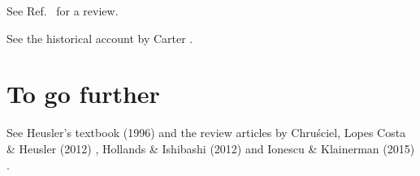 See Ref.~\cite{IonesK15} for a review.

\begin{hist}
See the historical account by Carter \cite{Carte99}.
\end{hist}


\section{To go further}

See Heusler's textbook (1996) \cite{Heusl96} and the review
articles by Chru\'sciel, Lopes Costa \& Heusler (2012) \cite{ChrusLH12},
Hollands \& Ishibashi (2012) \cite{HollaI12} and
Ionescu \& Klainerman (2015) \cite{IonesK15}.

